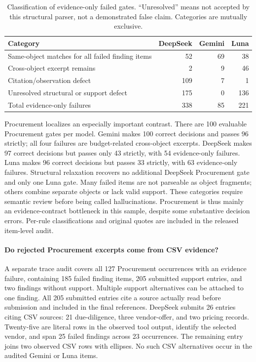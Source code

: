 \begin{table}[!htb]
\centering\small
\caption{Classification of evidence-only failed gates. ``Unresolved'' means not accepted by
this structural parser, not a demonstrated false claim. Categories are mutually exclusive.}
\begin{tabularx}{\linewidth}{@{}Lrrr@{}}
\toprule
Category & DeepSeek & Gemini & Luna\\
\midrule
Same-object matches for all failed finding items & 52 & 69 & 38\\
Cross-object excerpt remains & 2 & 9 & 46\\
Citation/observation defect & 109 & 7 & 1\\
Unresolved structural or support defect & 175 & 0 & 136\\
\midrule
Total evidence-only failures & 338 & 85 & 221\\
\bottomrule
\end{tabularx}
\end{table}

Procurement localizes an especially important contrast. There are 100 evaluable Procurement
gates per model. Gemini makes 100 correct decisions and passes 96 strictly; all four failures
are budget-related cross-object excerpts. DeepSeek makes 97 correct decisions but passes only
43 strictly, with 54 evidence-only failures. Luna makes 96 correct decisions but passes 33
strictly, with 63 evidence-only failures. Structural relaxation recovers no additional DeepSeek
Procurement gate and only one Luna gate. Many failed items are not parseable as object fragments;
others combine separate objects or lack valid support. These categories require semantic review
before being called hallucinations. Procurement is thus mainly an evidence-contract bottleneck
in this sample, despite some substantive decision errors. Per-rule classifications and original
quotes are included in the released item-level audit.

\paragraph{Do rejected Procurement excerpts come from CSV evidence?}
A separate trace audit covers all 127 Procurement occurrences with an evidence failure,
containing 185 failed finding items, 205 submitted support entries, and two findings without
support. Multiple support alternatives can be attached to one finding. All 205 submitted
entries cite a source actually read before submission and included in the final references.
DeepSeek submits 26 entries citing CSV sources: 21 due-diligence, three vendor-offer, and two
pricing records. Twenty-five are literal rows in the observed tool output, identify the selected
vendor, and span 25 failed findings across 23 occurrences. The remaining entry joins two observed
CSV rows with ellipses. No such CSV alternatives occur in the audited Gemini or Luna items.


